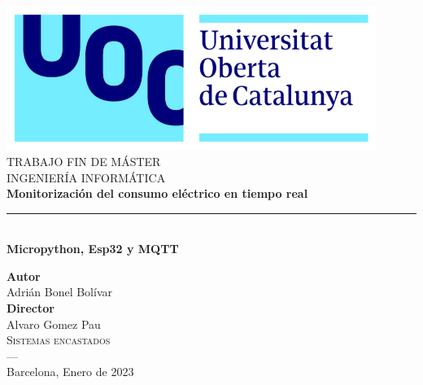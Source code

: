 \begin{titlepage}
 
\newlength{\centeroffset}
\setlength{\centeroffset}{-0.5\oddsidemargin}
\addtolength{\centeroffset}{0.5\evensidemargin}
\thispagestyle{empty}

\noindent\hspace*{\centeroffset}\begin{minipage}{\textwidth}

\centering
\includegraphics[width=0.9\textwidth]{imagenes/logo_uoc.png}\\[1.4cm]

\textsc{ \Large TRABAJO FIN DE MÁSTER\\[0.2cm]}
\textsc{ INGENIERÍA INFORMÁTICA}\\[1cm]
% 
{\Huge\bfseries Monitorización del consumo eléctrico en tiempo real\\
}
\noindent\rule[-1ex]{\textwidth}{3pt}\\[3.5ex]
{\large\bfseries Micropython, Esp32 y MQTT}
\end{minipage}

\vspace{2.5cm}
\noindent\hspace*{\centeroffset}\begin{minipage}{\textwidth}
\centering

\textbf{Autor}\\ {Adrián Bonel Bolívar}\\[2.5ex]
\textbf{Director}\\{Alvaro Gomez Pau}\\[2cm]
\textsc{Sistemas encastados}\\
\textsc{---}\\
Barcelona, Enero de 2023
\end{minipage}
\end{titlepage}



